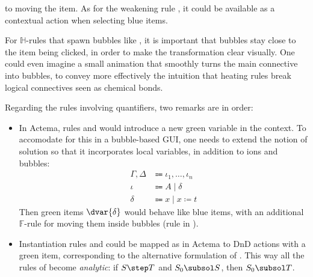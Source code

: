 \begin{description}
    to moving the item. As for the weakening rule
    {}, it could be available as a contextual action when selecting
    blue items.
  \item[\textbf{\heating}]
    For $\mathbb{H}$-rules that spawn bubbles like {\rnm{\land{+}}}, it is
    important that bubbles stay close to the item being clicked, in order to
    make the transformation clear visually. One could even imagine a small
    animation that smoothly turns the main connective into bubbles, to convey
    more effectively the intuition that heating rules break logical connectives
    seen as chemical bonds.

    Regarding the rules involving quantifiers, two remarks are in order:
    \begin{itemize}
      \item In Actema, rules {\rnm{\forall{+}}} and {\rnm{\exists{-}}} would
      introduce a new green variable in the context. To accomodate for this in a
      bubble-based GUI, one needs to extend the notion of solution so that
      it incorporates local variables, in addition to ions and bubbles:
      \begin{align*}
        \Gamma, \Delta &\Coloneq \iota_1, \ldots, \iota_n \\
        \iota &\Coloneq A \mid \delta \\
        \delta &\Coloneq x \mid x \coloneq t
      \end{align*}
      Then green items $\dvar{\delta}$ would behave like blue items, with an
      additional $\mathbb{F}$-rule for moving them inside bubbles (rule
      {} in ).
      \item Instantiation rules {\rnm{\forall{-}}} and {\rnm{\exists{+}}} could
      be mapped as in Actema to DnD actions with a green item, corresponding to
      the alternative formulation of . This way all the
      rules of  become \emph{analytic}: if $S \step T$ and $S_0 \subsol
      S$, then $S_0 \subsol T$.
    \end{itemize}


\end{description}
